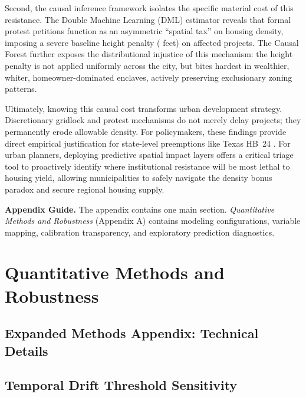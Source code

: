 \documentclass[11pt, letterpaper, oneside]{article}
\begin{document}
Second, the causal inference framework isolates the specific material cost of this resistance. The Double Machine Learning (DML) estimator reveals that formal protest petitions function as an asymmetric ``spatial tax'' on housing density, imposing a severe baseline height penalty (\metricRobustTreatContinuous{} feet) on affected projects. The Causal Forest further exposes the distributional injustice of this mechanism: the height penalty is not applied uniformly across the city, but bites hardest in wealthier, whiter, homeowner-dominated enclaves, actively preserving exclusionary zoning patterns. 

Ultimately, knowing this causal cost transforms urban development strategy. Discretionary gridlock and protest mechanisms do not merely delay projects; they permanently erode allowable density. For policymakers, these findings provide direct empirical justification for state-level preemptions like Texas HB~24 \cite{hb24_2025}. For urban planners, deploying predictive spatial impact layers offers a critical triage tool to proactively identify where institutional resistance will be most lethal to housing yield, allowing municipalities to safely navigate the density bonus paradox and secure regional housing supply.

\appendix

\newpage
\noindent \textbf{Appendix Guide.} The appendix contains one main section. \textit{Quantitative Methods and Robustness} (Appendix A) contains modeling configurations, variable mapping, calibration transparency, and exploratory prediction diagnostics.

\section{Quantitative Methods and Robustness}
\label{app:quantitative_supp}

\subsection{Expanded Methods Appendix: Technical Details}
\label{app:methodology_details}



\newpage








\newpage
\newpage
\subsection{Temporal Drift Threshold Sensitivity}
\label{app:drift_sensitivity}
\end{document}

